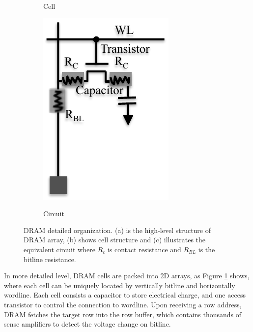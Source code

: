 \begin{figure}
\begin{subfigure}{.16\textwidth}
    \caption{Cell}
    \label{fig:dram_cell}
  \end{subfigure}
  \begin{subfigure}{.16\textwidth}
    \centering
    	\includegraphics[width=\linewidth]{figures/dram_rc.pdf}\\
    \caption{Circuit}
    \label{fig:dram_rc}
  \end{subfigure}
  \vspace{-0.45in}
  \caption{DRAM detailed organization. (a) is the high-level structure of DRAM array, (b) shows cell structure and (c) illustrates the equivalent circuit where $R_c$ is contact resistance and $R_{BL}$ is the bitline resistance.}
  \label{fig:dram_bank}
  \vspace{-0.45in}
\end{figure}

In more detailed level, DRAM cells are packed into 2D arrays, as Figure \ref{fig:dram_cell} shows, where each cell can be uniquely located by vertically bitline and horizontally wordline.
Each cell consists a capacitor to store electrical charge, and one access transistor to control the connection to wordline.
Upon receiving a row address, DRAM fetches the target row into the row buffer, which contains thousands of sense amplifiers to detect the voltage change on bitline.


